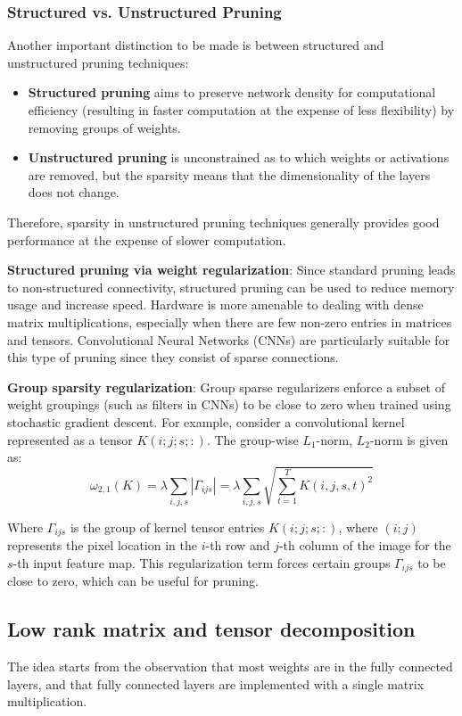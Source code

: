 \subsubsection{Structured vs. Unstructured Pruning}
Another important distinction to be made is between structured and unstructured
pruning techniques:
\begin{itemize}
    \item \textbf{Structured pruning} aims to preserve network density for
          computational efficiency (resulting in faster computation at the expense
          of less flexibility) by removing groups of weights.
    \item \textbf{Unstructured pruning} is unconstrained as to which weights or
          activations are removed, but the sparsity means that the dimensionality
          of the layers does not change.
\end{itemize}
Therefore, sparsity in unstructured pruning techniques generally provides good
performance at the expense of slower computation.

\textbf{Structured pruning via weight regularization}: Since standard pruning
leads to non-structured connectivity, structured pruning can be used to reduce
memory usage and increase speed. Hardware is more amenable to dealing with dense
matrix multiplications, especially when there are few non-zero entries in matrices
and tensors. Convolutional Neural Networks (CNNs) are particularly suitable for
this type of pruning since they consist of sparse connections.

\textbf{Group sparsity regularization}: Group sparse regularizers enforce a subset
of weight groupings (such as filters in CNNs) to be close to zero when trained
using stochastic gradient descent. For example, consider a convolutional kernel
represented as a tensor $K(i; j; s; :)$. The group-wise $L_1$-norm, $L_2$-norm
is given as:
\begin{equation*}
    \omega_{2, 1}(K) = \lambda \sum_{i, j, s} | \Gamma_{ijs} | = \lambda \sum_{i, j, s} \sqrt{\sum_{t= 1}^T K(i, j, s, t)^2}
\end{equation*}

Where $\Gamma_{ijs}$ is the group of kernel tensor entries $K(i; j; s; :)$, where
$(i;j)$ represents the pixel location in the $i$-th row and $j$-th column of the
image for the $s$-th input feature map. This regularization term forces certain
groups $\Gamma_{ijs}$ to be close to zero, which can be useful for pruning.

\subsection{Low rank matrix and tensor decomposition}
The idea starts from the observation that most weights are in the fully connected
layers, and that fully connected layers are implemented with a single matrix
multiplication.
